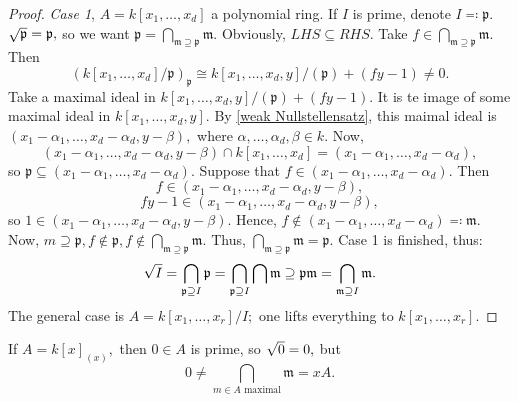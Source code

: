 \begin{proof}
  \emph{Case 1}, \(A = k[x_1, \dotsc, x_d]\) a polynomial ring.
  If \(I\) is prime, denote \(I \eqqcolon \mathfrak p.\) \(\sqrt{\mathfrak p} = \mathfrak p,\) so we want
  \(\mathfrak p = \bigcap_{\mathfrak m \supseteq \mathfrak p} \mathfrak m.\)
  Obviously, \(LHS \subseteq RHS.\)
  Take
  \(f \in \bigcap_{\mathfrak m \supseteq \mathfrak p} \mathfrak m.\) Then
  \[(k[x_1, \dotsc, x_d]/{\mathfrak p})_{\mathfrak p} \cong k[x_1, \dotsc, x_d, y]/{(\mathfrak p) + (fy-1)} \neq 0.\]
  Take a maximal ideal in
  \(k[x_1, \dotsc, x_d, y]/{(\mathfrak p) + (fy-1)}.\)
  It is te image of some maximal ideal in
  \(k[x_1, \dotsc, x_d, y].\)
  By \cref{weak Nullstellensatz}, this maimal ideal is
  \((x_1 - \alpha_1, \dotsc, x_d - \alpha_d, y - \beta),\)
  where
  \(\alpha, \dotsc, \alpha_d, \beta \in k.\)
  Now,
  \[(x_1 - \alpha_1, \dotsc, x_d - \alpha_d, y - \beta) \cap k[x_1, \dotsc, x_d] = (x_1 - \alpha_1, \dotsc, x_d - \alpha_d),\]
  so \(\mathfrak p \subseteq (x_1 - \alpha_1, \dotsc, x_d - \alpha_d).\)
  Suppose that
  \(f \in (x_1 - \alpha_1, \dotsc, x_d - \alpha_d).\)
  Then
  \[f \in (x_1 - \alpha_1, \dotsc, x_d - \alpha_d, y-\beta),\]
  \[fy-1 \in (x_1 - \alpha_1, \dotsc, x_d - \alpha_d, y - \beta),\]
  so \(1 \in (x_1 - \alpha_1, \dotsc, x_d - \alpha_d, y - \beta).\)
  Hence,
  \(f \notin (x_1 - \alpha_1, \dotsc, x_d - \alpha_d) \eqqcolon \mathfrak m.\)
  Now,
  \(m \supseteq \mathfrak p, f \notin \mathfrak p, f \notin \bigcap_{\mathfrak m \supseteq \mathfrak p} \mathfrak m.\)
  Thus,
  \(\bigcap_{\mathfrak m \supseteq \mathfrak p} \mathfrak m = \mathfrak p.\)
  Case 1 is finished, thus:
  \[\sqrt{I} = \bigcap_{\mathfrak p \supseteq I} \mathfrak p = \bigcap_{\mathfrak p \supseteq I} \bigcap \mathfrak m \supseteq \mathfrak p \mathfrak m = \bigcap_{\mathfrak m \supseteq I} \mathfrak m.\]
  The general case is
  \(A = k[x_1, \dotsc, x_r]/{I};\) one lifts everything to \(k[x_1, \dotsc, x_r].\)
\end{proof}

\begin{example}
  If \(A = k[x]_{(x)},\) then \(0 \in A\) is prime, so \(\sqrt{0} = 0,\) but \[0 \neq \bigcap_{m \in A \text{ maximal}} \mathfrak m = x A.\]
\end{example}




